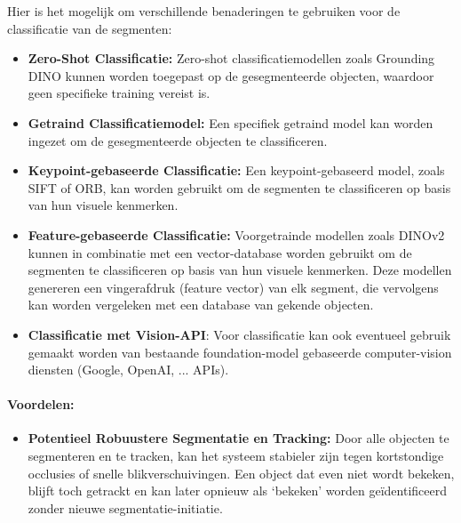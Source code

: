 Hier is het mogelijk om verschillende benaderingen te gebruiken voor de classificatie van de segmenten:
\begin{itemize}
    \item \textbf{Zero-Shot Classificatie:} Zero-shot classificatiemodellen zoals Grounding\\ DINO kunnen worden toegepast op de gesegmenteerde objecten, waardoor geen specifieke training vereist is.
    \item \textbf{Getraind Classificatiemodel:} Een specifiek getraind model kan worden ingezet om de gesegmenteerde objecten te classificeren.
    \item \textbf{Keypoint-gebaseerde Classificatie:} Een keypoint-gebaseerd model, zoals\\ SIFT of ORB, kan worden gebruikt om de segmenten te classificeren op basis van hun visuele kenmerken.
    \item \textbf{Feature-gebaseerde Classificatie:} Voorgetrainde modellen zoals DINOv2\\ kunnen in combinatie met een vector-database worden gebruikt om de segmenten te classificeren op basis van hun visuele kenmerken.
    Deze modellen genereren een vingerafdruk (feature vector) van elk segment, die vervolgens kan worden vergeleken met een database van gekende objecten.
    \item \textbf{Classificatie met Vision-API}: Voor classificatie kan ook eventueel gebruik gemaakt worden van bestaande foundation-model gebaseerde computer-vis\-ion diensten (Google, OpenAI, ... APIs).
\end{itemize}

\paragraph{Voordelen:}
\begin{itemize}
    \item \textbf{Potentieel Robuustere Segmentatie en Tracking:} Door alle objecten te segmenteren en te tracken, kan het systeem stabieler zijn tegen kortstondige 
    occlusies of snelle blikverschuivingen. Een object dat even niet wordt bekeken, blijft toch getrackt en kan later opnieuw als `bekeken' worden geïdentificeerd zonder nieuwe segmentatie-initiatie.
\end{itemize}

